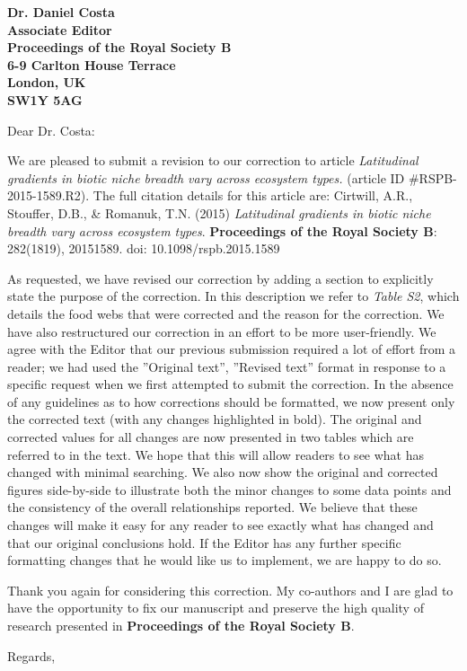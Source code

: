 \documentclass[12pt]{letter}
\begin{document}
\begin{letter}{\bf Dr. Daniel Costa\\
               Associate Editor\\
               Proceedings of the Royal Society B\\
               6-9 Carlton House Terrace\\
               London, UK\\
               SW1Y 5AG\\
                }

\opening{Dear Dr. Costa:}

We are pleased to submit a revision to our correction to article \emph{Latitudinal gradients in biotic niche breadth vary across ecosystem types.} (article ID \#RSPB-2015-1589.R2). The full citation details for this article are: Cirtwill, A.R., Stouffer, D.B., \& Romanuk, T.N. (2015) \emph{Latitudinal gradients in biotic niche breadth vary across ecosystem types}. \textbf{Proceedings of the Royal Society B}: 282(1819), 20151589. doi: 10.1098/rspb.2015.1589 


As requested, we have revised our correction by adding a section to explicitly state the purpose of the correction. In this description we refer to \emph{Table S2}, which details the food webs that were corrected and the reason for the correction. We have also restructured our correction in an effort to be more user-friendly. We agree with the Editor that our previous submission required a lot of effort from a reader; we had used the ''Original text'', ''Revised text'' format in response to a specific request when we first attempted to submit the correction. In the absence of any guidelines as to how corrections should be formatted, we now present only the corrected text (with any changes highlighted in bold). The original and corrected values for all changes are now presented in two tables which are referred to in the text. We hope that this will allow readers to see what has changed with minimal searching. We also now show the original and corrected figures side-by-side to illustrate both the minor changes to some data points and the consistency of the overall relationships reported. We believe that these changes will make it easy for any reader to see exactly what has changed and that our original conclusions hold. If the Editor has any further specific formatting changes that he would like us to implement, we are happy to do so.


Thank you again for considering this correction. My co-authors and I are glad to have the opportunity to fix our manuscript and preserve the high quality of research presented in \textbf{Proceedings of the Royal Society B}.


\closing{Regards,}


\end{letter}


\end{document}
